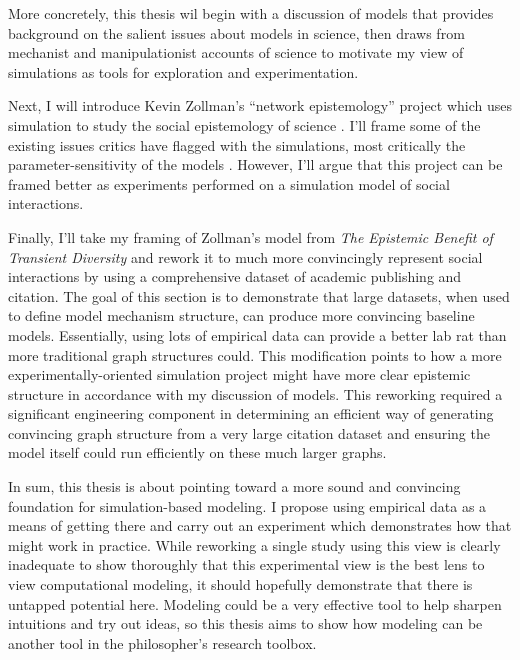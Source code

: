 More concretely, this thesis wil begin with a discussion of models that
provides background on the salient issues about models in science, then
draws from mechanist and manipulationist accounts of science to motivate
my view of simulations as tools for exploration and experimentation.

Next, I will introduce Kevin Zollman's ``network epistemology'' project
which uses simulation to study the social epistemology of science
\autocite[\textcite{zollmanEpistemicBenefitTransient2009}]{zollmanNetworkEpistemologyCommunication2013}.
I'll frame some of the existing issues critics have flagged with the
simulations, most critically the parameter-sensitivity of the models
\autocite{rosenstockEpistemicNetworksLess2017a}. However, I'll argue
that this project can be framed better as experiments performed on a
simulation model of social interactions.

Finally, I'll take my framing of Zollman's model from \emph{The
Epistemic Benefit of Transient Diversity} and rework it to much more
convincingly represent social interactions by using a comprehensive
dataset of academic publishing and citation. The goal of this section is
to demonstrate that large datasets, when used to define model mechanism
structure, can produce more convincing baseline models. Essentially,
using lots of empirical data can provide a better lab rat than more
traditional graph structures could. This modification points to how a
more experimentally-oriented simulation project might have more clear
epistemic structure in accordance with my discussion of models. This
reworking required a significant engineering component in determining an
efficient way of generating convincing graph structure from a very large
citation dataset and ensuring the model itself could run efficiently on
these much larger graphs.

In sum, this thesis is about pointing toward a more sound and convincing
foundation for simulation-based modeling. I propose using empirical data
as a means of getting there and carry out an experiment which
demonstrates how that might work in practice. While reworking a single
study using this view is clearly inadequate to show thoroughly that this
experimental view is the best lens to view computational modeling, it
should hopefully demonstrate that there is untapped potential here.
Modeling could be a very effective tool to help sharpen intuitions and
try out ideas, so this thesis aims to show how modeling can be another
tool in the philosopher's research toolbox.
